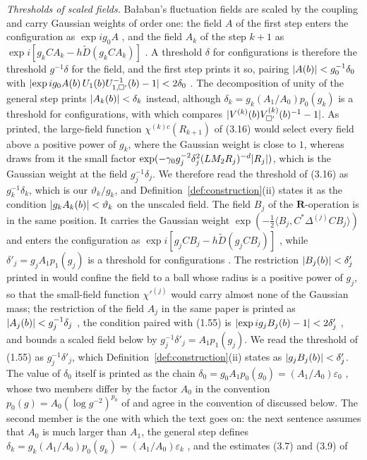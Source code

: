 \documentclass[11pt]{preprint}
\DeclarePairedDelimiter{\abs}{\lvert}{\rvert}
\numberwithin{equation}{section}
\theoremstyle{definition}
\theoremstyle{remark}
\theoremstyle{plain}
\begin{document}
\emph{Thresholds of scaled fields.} Ba{\l}aban's fluctuation fields are scaled by the coupling and carry Gaussian weights of order one: the field $A$ of the first step enters the configuration as $\exp ig_0A$ \cite[(1.19), p.~250]{BalabanCRE}, and the field $A_k$ of the step $k + 1$ as $\exp i[g_kCA_k - h\tilde D(g_kCA_k)]$ \cite[(3.15), p.~268]{BalabanCRE}. A threshold $\delta$ for configurations is therefore the threshold $g^{-1}\delta$ for the field, and the first step prints it so, pairing $\abs{A(b)} < g_0^{-1}\delta_0$ with $\abs{\exp ig_0A(b)\,U_1(b)U_{1,\square'}^{-1}(b) - 1} < 2\delta_0$ \cite[(1.18), (1.19), p.~250]{BalabanCRE}. The decomposition of unity of the general step \cite[(3.16), p.~268]{BalabanCRE} prints $\abs{A_k(b)} < \delta_k$ instead, although $\delta_k = g_k(A_1/A_0)p_0(g_k)$ \cite[p.~265]{BalabanCRE} is a threshold for configurations, with which \cite[(3.19), p.~268]{BalabanCRE} compares $\abs{V^{(k)}(b)V^{(k)}_{\square'}(b)^{-1} - 1}$. As printed, the large-field function $\chi^{(k)c}(R_{k+1})$ of (3.16) would select every field above a positive power of $g_k$, where the Gaussian weight is close to $1$, whereas \cite[p.~380]{BalabanLFR2} draws from it the small factor $\exp(-\gamma_0g_j^{-2}\delta_j^2(LM_2R_j)^{-d}\abs{R_j})$, which is the Gaussian weight at the field $g_j^{-1}\delta_j$. We therefore read the threshold of (3.16) as $g_k^{-1}\delta_k$, which is our $\vartheta_k/g_k$, and Definition~\ref{def:construction}(ii) states it as the condition $\abs{g_kA_k(b)} < \vartheta_k$ on the unscaled field. The field $B_j$ of the $\mathbf R$-operation is in the same position. It carries the Gaussian weight $\exp(-\frac12\langle B_j, C^*\Delta^{(j)}CB_j\rangle)$ and enters the configuration as $\exp i[g_jCB_j - h\tilde D(g_jCB_j)]$ \cite[(1.60), pp.~188--189]{BalabanLFR1}, while $\delta'_j = g_jA_1p_1(g_j)$ \cite[p.~183]{BalabanLFR1} is a threshold for configurations \cite[(1.27), p.~182]{BalabanLFR1}. The restriction $\abs{B_j(b)} < \delta'_j$ printed in \cite[(1.55), p.~188]{BalabanLFR1} would confine the field to a ball whose radius is a positive power of $g_j$, so that the small-field function $\chi'^{(j)}$ would carry almost none of the Gaussian mass; the restriction of the field $A_j$ in the same paper is printed as $\abs{A_j(b)} < g_j^{-1}\delta_j$ \cite[(1.9), p.~178]{BalabanLFR1}, the condition paired with (1.55) is $\abs{\exp ig_jB_j(b) - 1} < 2\delta'_j$ \cite[(1.59), p.~188]{BalabanLFR1}, and \cite[p.~383]{BalabanLFR2} bounds a scaled field below by $g_j^{-1}\delta'_j = A_1p_1(g_j)$. We read the threshold of (1.55) as $g_j^{-1}\delta'_j$, which Definition~\ref{def:construction}(ii) states as $\abs{g_jB_j(b)} < \delta'_j$. The value of $\delta_0$ itself is printed as the chain $\delta_0 = g_0A_1p_0(g_0) = (A_1/A_0)\varepsilon_0$ \cite[p.~247]{BalabanCRE}, whose two members differ by the factor $A_0$ in the convention $p_0(g) = A_0(\log g^{-2})^{p_0}$ of \cite[p.~246]{BalabanCRE} and agree in the convention of \cite[pp.~380--383]{BalabanLFR2} discussed below. The second member is the one with which the text goes on: the next sentence assumes that $A_0$ is much larger than $A_1$, the general step defines $\delta_k = g_k(A_1/A_0)p_0(g_k) = (A_1/A_0)\varepsilon_k$ \cite[p.~265]{BalabanCRE}, and the estimates (3.7) and (3.9) of 
\end{document}
